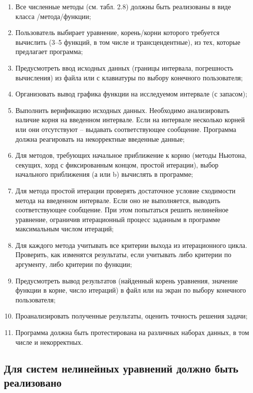 \documentclass{article}
\begin{document}
\begin{enumerate}
      \item Все численные методы (см. табл. 2.8) должны быть реализованы в виде класса /метода/функции;
      \item Пользователь выбирает уравнение, корень/корни которого требуется вычислить (3–5 функций, в том числе и трансцендентные), из тех, которые предлагает программа;
      \item Предусмотреть ввод исходных данных (границы интервала, погрешность вычисления) из файла или с клавиатуры по выбору конечного пользователя;
      \item Организовать вывод графика функции на исследуемом интервале (с запасом);
      \item Выполнить верификацию исходных данных. Необходимо анализировать наличие корня на введенном интервале. Если на интервале несколько корней или они отсутствуют – выдавать соответствующее сообщение. Программа должна реагировать на некорректные введенные данные;
      \item Для методов, требующих начальное приближение к корню (методы Ньютона, секущих, хорд с фиксированным концом, простой итерации), выбор начального приближения (а или b) вычислять в программе;
      \item Для метода простой итерации проверять достаточное условие сходимости метода на введенном интервале. Если оно не выполняется, выводить соответствующее сообщение. При этом попытаться решить нелинейное уравнение, ограничив итерационный процесс заданным в программе максимальным числом итераций;
      \item Для каждого метода учитывать все критерии выхода из итерационного цикла. Проверить, как изменятся результаты, если учитывать либо критерии по аргументу, либо критерии по функции;
      \item Предусмотреть вывод результатов (найденный корень уравнения, значение функции в корне, число итераций) в файл или на экран по выбору конечного пользователя;
      \item Проанализировать полученные результаты, оценить точность решения задачи;
      \item Программа должна быть протестирована на различных наборах данных, в том числе и некорректных.
\end{enumerate}

\subsection{Для систем нелинейных уравнений должно быть реализовано}
\end{document}
